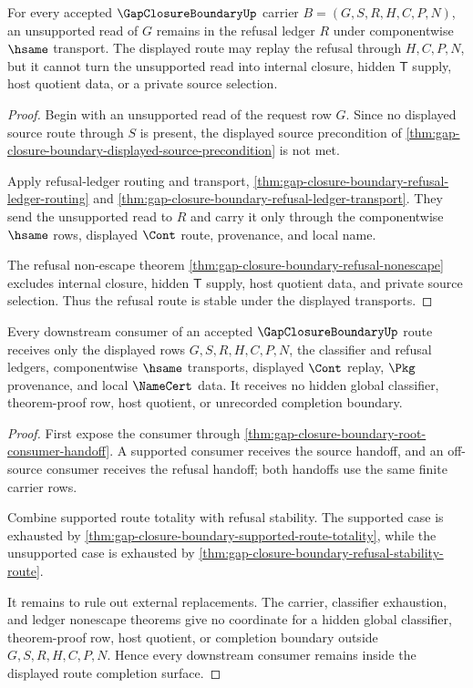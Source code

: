 \begin{theorem}
\label{thm:gap-closure-boundary-refusal-stability-route}
For every accepted $\GapClosureBoundaryUp$ carrier $B=(G,S,R,H,C,P,N)$, an unsupported read of $G$ remains in the refusal ledger $R$ under componentwise $\hsame$ transport. The displayed route may replay the refusal through $H,C,P,N$, but it cannot turn the unsupported read into internal closure, hidden $\mathsf{T}$ supply, host quotient data, or a private source selection.
\end{theorem}
\begin{proof}
Begin with an unsupported read of the request row $G$. Since no displayed source route through $S$ is present, the displayed source precondition of \autoref{thm:gap-closure-boundary-displayed-source-precondition} is not met.

Apply refusal-ledger routing and transport, \autoref{thm:gap-closure-boundary-refusal-ledger-routing} and \autoref{thm:gap-closure-boundary-refusal-ledger-transport}. They send the unsupported read to $R$ and carry it only through the componentwise $\hsame$ rows, displayed $\Cont$ route, provenance, and local name.

The refusal non-escape theorem \autoref{thm:gap-closure-boundary-refusal-nonescape} excludes internal closure, hidden $\mathsf{T}$ supply, host quotient data, and private source selection. Thus the refusal route is stable under the displayed transports.
\end{proof}

\begin{theorem}
\label{thm:gap-closure-boundary-consumer-nonescape}
Every downstream consumer of an accepted $\GapClosureBoundaryUp$ route receives only the displayed rows $G,S,R,H,C,P,N$, the classifier and refusal ledgers, componentwise $\hsame$ transports, displayed $\Cont$ replay, $\Pkg$ provenance, and local $\NameCert$ data. It receives no hidden global classifier, theorem-proof row, host quotient, or unrecorded completion boundary.
\end{theorem}
\begin{proof}
First expose the consumer through \autoref{thm:gap-closure-boundary-root-consumer-handoff}. A supported consumer receives the source handoff, and an off-source consumer receives the refusal handoff; both handoffs use the same finite carrier rows.

Combine supported route totality with refusal stability. The supported case is exhausted by \autoref{thm:gap-closure-boundary-supported-route-totality}, while the unsupported case is exhausted by \autoref{thm:gap-closure-boundary-refusal-stability-route}.

It remains to rule out external replacements. The carrier, classifier exhaustion, and ledger nonescape theorems give no coordinate for a hidden global classifier, theorem-proof row, host quotient, or completion boundary outside $G,S,R,H,C,P,N$. Hence every downstream consumer remains inside the displayed route completion surface.
\end{proof}
